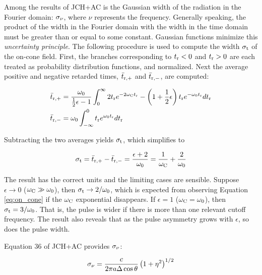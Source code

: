 \documentclass[amsmath,amssymb,aps,prd,10pt,twocolumn]{revtex4}
\begin{document}
Among the results of JCH+AC is the Gaussian width of the radiation in the Fourier domain: $\sigma_{\rm \nu}$, where $\nu$ represents the frequency.  Generally speaking, the product of the width in the Fourier domain with the width in the time domain must be greater than or equal to some constant.  Gaussian functions minimize this \textit{uncertainty principle}.  The following procedure is used to compute the width $\sigma_{\rm t}$ of the on-cone field.  First, the branches corresponding to $t_{\rm r} < 0$ and $t_{\rm r} > 0$ are each treated as probability distribution functions, and normalized.  Next the average positive and negative retarded times, $\bar{t}_{\rm r,+}$ and $\bar{t}_{\rm r,-}$, are computed:

\begin{align}
\bar{t}_{\rm r,+} &= \frac{\omega_{\rm 0}}{\frac{1}{2}\epsilon - 1} \int_{0}^{\infty} 2 t_{\rm r} e^{-2\omega_{\rm C} t_{\rm r}} - \left(1+\frac{1}{2}\epsilon \right) t_{\rm r} e^{-\omega_{\rm 0} t_{\rm r}} dt_{\rm r}  \\
\bar{t}_{\rm r,-} &= \omega_{\rm 0} \int_{-\infty}^{0} t_{\rm r} e^{\omega_{\rm 0} t_{\rm r}} dt_{\rm r}
\end{align}

Subtracting the two averages yields $\sigma_{\rm t}$, which simplifies to

\begin{equation}
\sigma_{\rm t} = \bar{t}_{\rm r,+} - \bar{t}_{\rm r,-} = \frac{\epsilon+2}{\omega_{\rm 0}} = \frac{1}{\omega_{\rm C}} + \frac{2}{\omega_{\rm 0}} \label{eq:width_oncone}
\end{equation}

The result has the correct units and the limiting cases are sensible.  Suppose $\epsilon \to 0$ ($\omega_{\rm C} \gg \omega_{\rm 0}$), then $\sigma_{\rm t} \to 2/\omega_{\rm 0}$, which is expected from observing Equation \ref{eq:on_cone} if the $\omega_{\rm C}$ exponential disappears.  If $\epsilon = 1$ ($\omega_{\rm C} = \omega_{\rm 0}$), then $\sigma_{\rm t} = 3/\omega_{\rm 0}$.  That is, the pulse is wider if there is more than one relevant cutoff frequency.  The result also reveals that as the pulse asymmetry grows with $\epsilon$, so does the pulse width.

Equation 36 of JCH+AC \cite{10.1016/j.astropartphys.2017.03.008} provides $\sigma_{\rm \nu}$:

\begin{equation}
\sigma_{\rm \nu} = \frac{c}{2\pi a \Delta\cos\theta}\left(1+\eta^2\right)^{1/2} \label{eq:sigmanu}
\end{equation}
\end{document}
